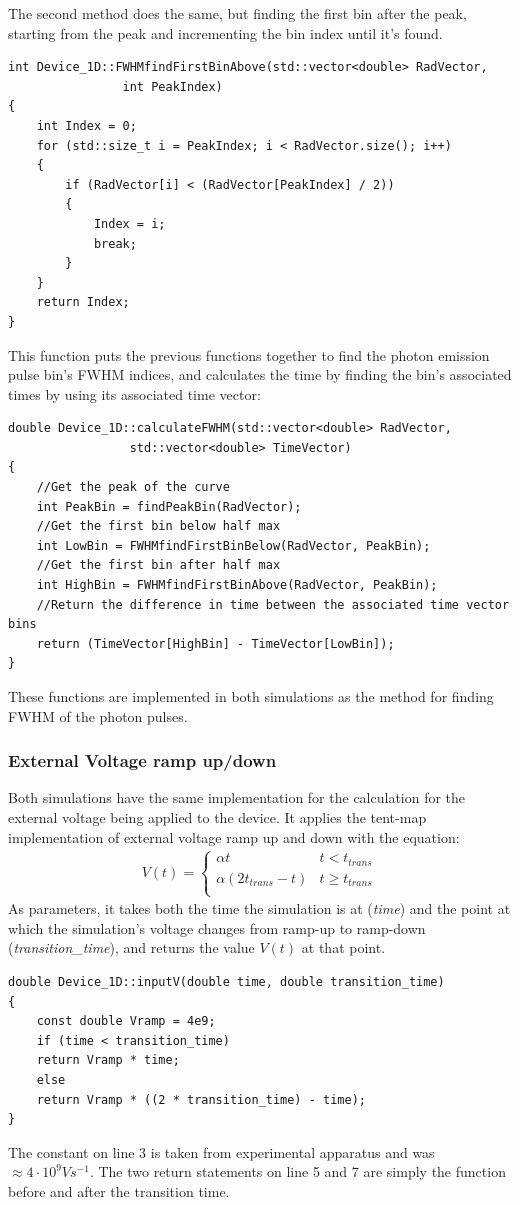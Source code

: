\documentclass[titlepage]{article}
\begin{document}
The second method does the same, but finding the first bin after the peak, starting from the peak and incrementing the bin index until it's found.
\begin{lstlisting}[caption = Method for finding first bin to fall below half peak after peak]
int Device_1D::FWHMfindFirstBinAbove(std::vector<double> RadVector, 
				int PeakIndex)
{
	int Index = 0;
	for (std::size_t i = PeakIndex; i < RadVector.size(); i++)
	{
		if (RadVector[i] < (RadVector[PeakIndex] / 2))
		{
			Index = i;
			break;
		}
	}
	return Index;
}
\end{lstlisting}
This function puts the previous functions together to find the photon emission pulse bin's FWHM indices, and calculates the time by finding the bin's associated times by using its associated time vector:
\begin{lstlisting}[caption = Method for calculating FWHM from an std::vector of values]
double Device_1D::calculateFWHM(std::vector<double> RadVector,
				 std::vector<double> TimeVector)
{
	//Get the peak of the curve
	int PeakBin = findPeakBin(RadVector);
	//Get the first bin below half max
	int LowBin = FWHMfindFirstBinBelow(RadVector, PeakBin);
	//Get the first bin after half max
	int HighBin = FWHMfindFirstBinAbove(RadVector, PeakBin);
	//Return the difference in time between the associated time vector bins
	return (TimeVector[HighBin] - TimeVector[LowBin]);
}
\end{lstlisting}
These functions are implemented in both simulations as the method for finding FWHM of the photon pulses.

\subsubsection{External Voltage ramp up/down}
Both simulations have the same implementation for the calculation for the external voltage being applied to the device. It applies the tent-map implementation of external voltage ramp up and down with the equation:
\begin{eqnarray}
V(t) = \begin{cases}
\alpha t &t < t_{trans}\\
\alpha(2t_{trans} - t) &t \geq t_{trans}\\
\end{cases}
\end{eqnarray}
As parameters, it takes both the time the simulation is at (\textit{time}) and the point at which the simulation's voltage changes from ramp-up to ramp-down (\textit{transition\_time}), and returns the value $V(t)$ at that point.
\begin{lstlisting}
double Device_1D::inputV(double time, double transition_time)
{
	const double Vramp = 4e9;
	if (time < transition_time)
	return Vramp * time;
	else
	return Vramp * ((2 * transition_time) - time);
}
\end{lstlisting} 
The constant on line 3 is taken from experimental apparatus and was $\approx4\cdot10^9 Vs^{-1}$. The two return statements on line 5 and 7 are simply the function before and after the transition time.
\end{document}
